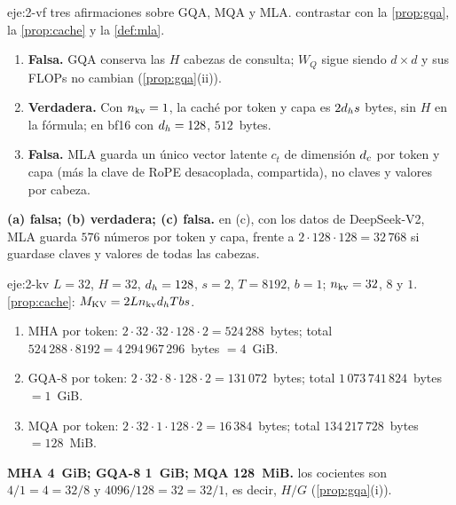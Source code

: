 \begin{solucion}{eje:2-vf}
\datos tres afirmaciones sobre GQA, MQA y MLA.
\planteamiento contrastar con la \cref{prop:gqa}, la \cref{prop:cache} y la \cref{def:mla}.
\pasos
\begin{enumerate}[label=(\alph*)]
  \item \textbf{Falsa.} GQA conserva las $H$ cabezas de consulta; $W_Q$ sigue siendo $d\times d$ y sus FLOPs no cambian (\cref{prop:gqa}(ii)).
  \item \textbf{Verdadera.} Con $n_{\mathrm{kv}}=1$, la caché por token y capa es $2d_{h} s$ bytes, sin $H$ en la fórmula; en bf16 con $d_{h}=128$, $512$~bytes.
  \item \textbf{Falsa.} MLA guarda un único vector latente $c_t$ de dimensión $d_{c}$ por token y capa (más la clave de RoPE desacoplada, compartida), no claves y valores por cabeza.
\end{enumerate}
\resultado \textbf{(a) falsa; (b) verdadera; (c) falsa.}
\comprobacion en (c), con los datos de DeepSeek-V2, MLA guarda $576$ números por token y capa, frente a $2\cdot 128\cdot 128=32\,768$ si guardase claves y valores de todas las cabezas.
\end{solucion}

\begin{solucion}{eje:2-kv}
\datos $L=32$, $H=32$, $d_{h}=128$, $s=2$, $T=8192$, $b=1$; $n_{\mathrm{kv}}=32$, $8$ y $1$.
\planteamiento \cref{prop:cache}: $M_{\mathrm{KV}}=2Ln_{\mathrm{kv}}d_{h} Tbs$.
\pasos
\begin{enumerate}[label=\arabic*.]
  \item MHA por token: $2\cdot 32\cdot 32\cdot 128\cdot 2=524\,288$~bytes; total $524\,288\cdot 8192=4\,294\,967\,296$~bytes $=4$~GiB.
  \item GQA-8 por token: $2\cdot 32\cdot 8\cdot 128\cdot 2=131\,072$~bytes; total $1\,073\,741\,824$~bytes $=1$~GiB.
  \item MQA por token: $2\cdot 32\cdot 1\cdot 128\cdot 2=16\,384$~bytes; total $134\,217\,728$~bytes $=128$~MiB.
\end{enumerate}
\resultado \textbf{MHA 4~GiB; GQA-8 1~GiB; MQA 128~MiB.}
\comprobacion los cocientes son $4/1=4=32/8$ y $4096/128=32=32/1$, es decir, $H/G$ (\cref{prop:gqa}(i)).
\end{solucion}

